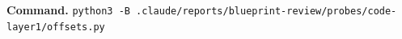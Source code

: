 \textbf{Command.} \texttt{p\allowbreak{}y\allowbreak{}t\allowbreak{}h\allowbreak{}o\allowbreak{}n\allowbreak{}3\allowbreak{} -{}\allowbreak{}B\allowbreak{} .\allowbreak{}c\allowbreak{}l\allowbreak{}a\allowbreak{}u\allowbreak{}d\allowbreak{}e\allowbreak{}/\allowbreak{}r\allowbreak{}e\allowbreak{}p\allowbreak{}o\allowbreak{}r\allowbreak{}t\allowbreak{}s\allowbreak{}/\allowbreak{}b\allowbreak{}l\allowbreak{}u\allowbreak{}e\allowbreak{}p\allowbreak{}r\allowbreak{}i\allowbreak{}n\allowbreak{}t\allowbreak{}-{}\allowbreak{}r\allowbreak{}e\allowbreak{}v\allowbreak{}i\allowbreak{}e\allowbreak{}w\allowbreak{}/\allowbreak{}p\allowbreak{}r\allowbreak{}o\allowbreak{}b\allowbreak{}e\allowbreak{}s\allowbreak{}/\allowbreak{}c\allowbreak{}o\allowbreak{}d\allowbreak{}e\allowbreak{}-{}\allowbreak{}l\allowbreak{}a\allowbreak{}y\allowbreak{}e\allowbreak{}r\allowbreak{}1\allowbreak{}/\allowbreak{}o\allowbreak{}f\allowbreak{}f\allowbreak{}s\allowbreak{}e\allowbreak{}t\allowbreak{}s\allowbreak{}.\allowbreak{}p\allowbreak{}y}

